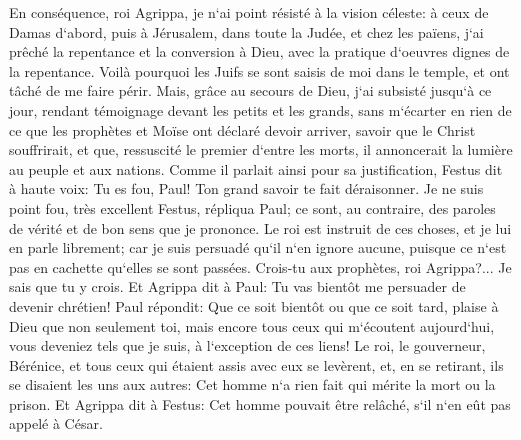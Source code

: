 \verse En conséquence, roi Agrippa, je n`ai point résisté à la vision céleste: 
\verse à ceux de Damas d`abord, puis à Jérusalem, dans toute la Judée, et chez les païens, j`ai prêché la repentance et la conversion à Dieu, avec la pratique d`oeuvres dignes de la repentance. 
\verse Voilà pourquoi les Juifs se sont saisis de moi dans le temple, et ont tâché de me faire périr. 
\verse Mais, grâce au secours de Dieu, j`ai subsisté jusqu`à ce jour, rendant témoignage devant les petits et les grands, sans m`écarter en rien de ce que les prophètes et Moïse ont déclaré devoir arriver, 
\verse savoir que le Christ souffrirait, et que, ressuscité le premier d`entre les morts, il annoncerait la lumière au peuple et aux nations. 
\verse Comme il parlait ainsi pour sa justification, Festus dit à haute voix: Tu es fou, Paul! Ton grand savoir te fait déraisonner. 
\verse Je ne suis point fou, très excellent Festus, répliqua Paul; ce sont, au contraire, des paroles de vérité et de bon sens que je prononce. 
\verse Le roi est instruit de ces choses, et je lui en parle librement; car je suis persuadé qu`il n`en ignore aucune, puisque ce n`est pas en cachette qu`elles se sont passées. 
\verse Crois-tu aux prophètes, roi Agrippa?... Je sais que tu y crois. 
\verse Et Agrippa dit à Paul: Tu vas bientôt me persuader de devenir chrétien! 
\verse Paul répondit: Que ce soit bientôt ou que ce soit tard, plaise à Dieu que non seulement toi, mais encore tous ceux qui m`écoutent aujourd`hui, vous deveniez tels que je suis, à l`exception de ces liens! 
\verse Le roi, le gouverneur, Bérénice, et tous ceux qui étaient assis avec eux se levèrent, 
\verse et, en se retirant, ils se disaient les uns aux autres: Cet homme n`a rien fait qui mérite la mort ou la prison. 
\verse Et Agrippa dit à Festus: Cet homme pouvait être relâché, s`il n`en eût pas appelé à César. 

\chapter{}

